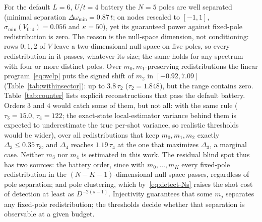 \documentclass[submission, PhysCore]{SciPost}
\begin{document}
For the default $L=6$, $U/t=4$ battery the $N=5$ poles are well separated (minimal separation $\Delta\omega_{\min}=0.87\,t$; on nodes rescaled to $[-1,1]$, $\sigma_{\min}(V_{0:4})=0.056$ and $\kappa=50$), yet its guaranteed power against fixed-pole redistribution is zero. The reason is the null-space dimension, not conditioning: rows $0,1,2$ of $V$ leave a two-dimensional null space on five poles, so every redistribution in it passes, whatever its size; the same holds for any spectrum with four or more distinct poles. Over $m_0,m_1$-preserving redistributions the linear program~\eqref{eq:wclp} puts the signed shift of $m_2$ in $[-0.92,7.09]$ (Table~\ref{tab:withinsector}): up to $3.8\,\tau_2$ ($\tau_2=1.848$), but the range contains zero. Table~\ref{tab:counter} lists explicit reconstructions that pass the default battery. Orders $3$ and $4$ would catch some of them, but not all: with the same rule ($\tau_3=15.0$, $\tau_4=122$; the exact-state local-estimator variance behind them is expected to underestimate the true per-shot variance, so realistic thresholds would be wider), over all redistributions that keep $m_0,m_1,m_2$ exactly $\Delta_3\le0.35\,\tau_3$, and $\Delta_4$ reaches $1.19\,\tau_4$ at the one that maximizes $\Delta_3$, a marginal case. Neither $m_3$ nor $m_4$ is estimated in this work. The residual blind spot thus has two sources: the battery order, since with $m_0,\dots,m_K$ every fixed-pole redistribution in the $(N-K-1)$-dimensional null space passes, regardless of pole separation; and pole clustering, which by~\eqref{eq:detect-Ns} raises the shot cost of detection at least as $D^{-2(s-1)}$. Injectivity guarantees that some $m_j$ separates any fixed-pole redistribution; the thresholds decide whether that separation is observable at a given budget.
\end{document}
